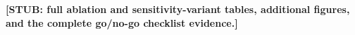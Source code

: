 \textbf{[STUB: full ablation and sensitivity-variant tables, additional
figures, and the complete go/no-go checklist evidence.]}
